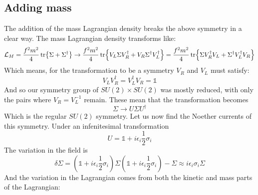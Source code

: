 \documentclass{article}
\begin{document}
\subsection{Adding mass}
The addition of the mass Lagrangian density breaks the above symmetry in a clear way. The mass Lagrangian density transforms like:
\begin{equation}
    \mathcal{L}_M = \frac{f^2m^2}{4}\tr{\Sigma + \Sigma^\dagger} \rightarrow \frac{f^2m^2}{4}\tr{V_L \Sigma V_R^\dagger + V_R \Sigma^\dagger V_L^\dagger} = \frac{f^2m^2}{4}\tr{\Sigma V_R^\dagger V_L + \Sigma^\dagger V_L^\dagger V_R}
\end{equation}
Which means, for the transformation to be a symmetry $V_R$ and $V_L$ must satisfy:
\begin{equation}
    V_L V_R^\dagger = V_L^\dagger V_R = \mathbb{1}
\end{equation}
And so our symmetry group of $SU(2) \times SU(2)$ was mostly reduced, with only the pairs where $V_R = V_L^{-1}$ remain. These mean that the transformation becomes
\begin{equation}
    \Sigma \rightarrow U \Sigma U^{\dagger}
\end{equation}
Which is the regular $SU(2)$ symmetry. Let us now find the Noether currents of this symmetry. Under an infenitesimal transformation
\begin{equation}
    U = \mathbb{1} + i\epsilon_i \frac{1}{2}\sigma_i
\end{equation}
The variation in the field is
\begin{equation}
    \delta \Sigma = \left(\mathbb{1} + i\epsilon_i \frac{1}{2}\sigma_i\right) \Sigma \left(\mathbb{1} + i\epsilon_i \frac{1}{2}\sigma_i\right) - \Sigma \approx i\epsilon_i\sigma_i \Sigma
\end{equation}
And the variation in the Lagrangian comes from both the kinetic and mass parts of the Lagrangian:
\end{document}
